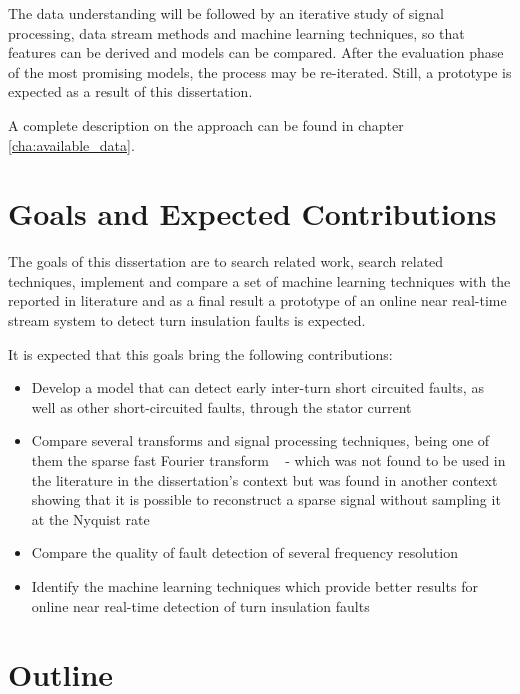 The data understanding will be followed by an iterative study of signal processing, data stream methods and machine learning techniques, so that features can be derived and models can be compared.
After the evaluation phase of the most promising models, the process may be re-iterated. Still, a prototype is expected as a result of this dissertation.

A complete description on the approach can be found in chapter \ref{cha:available_data}.






\section{Goals and Expected Contributions} %
\label{sec:contributions}

The goals of this dissertation are to search related work, search related techniques, implement and compare a set of machine learning techniques with the reported in literature and as a final result a prototype of an online  near real-time stream system to detect turn insulation faults is expected.

It is expected that this goals bring the following contributions:


\begin{itemize}
  \item 
  Develop a model that can detect early inter-turn short circuited faults, as well as other short-circuited faults, through the stator current
  \item 
  Compare several transforms and signal processing techniques, being one of them the sparse fast Fourier transform  ~\cite{Indyk2014} - which was not found to be used in the literature in the dissertation's context but was found in another context showing that it is possible to reconstruct a sparse signal without sampling it at the Nyquist rate ~\cite{Hassanieh2014}
  \item 
  Compare the quality of fault detection of several frequency resolution
  \item 
  Identify the machine learning techniques which provide better results for online near real-time detection of turn insulation faults
\end{itemize}


\section{Outline} %
\label{sec:outline}

